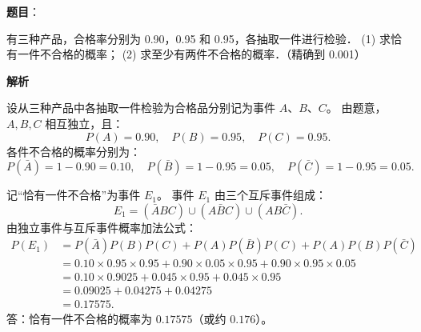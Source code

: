 \begin{answer}

\textbf{题目}：

有三种产品，合格率分别为 0.90，0.95 和 0.95，各抽取一件进行检验．
(1) 求恰有一件不合格的概率；
(2) 求至少有两件不合格的概率．（精确到 0.001）

\textbf{解析}

设从三种产品中各抽取一件检验为合格品分别记为事件 $A$、$B$、$C$。
由题意，$A, B, C$ 相互独立，且：
\nopagebreak[4]
\[P(A) = 0.90, \quad P(B) = 0.95, \quad P(C) = 0.95.\]
各件不合格的概率分别为：
\nopagebreak[4]
\[P(\bar{A}) = 1 - 0.90 = 0.10, \quad P(\bar{B}) = 1 - 0.95 = 0.05, \quad P(\bar{C}) = 1 - 0.95 = 0.05.\]


记“恰有一件不合格”为事件 $E_1$。
事件 $E_1$ 由三个互斥事件组成：
\nopagebreak[4]
\[E_1 = (\bar{A} B C) \cup (A \bar{B} C) \cup (A B \bar{C}).\]
由独立事件与互斥事件概率加法公式：
\nopagebreak[4]
\[\begin{aligned}
P(E_1) &= P(\bar{A})P(B)P(C) + P(A)P(\bar{B})P(C) + P(A)P(B)P(\bar{C}) \\
&= 0.10 \times 0.95 \times 0.95 + 0.90 \times 0.05 \times 0.95 + 0.90 \times 0.95 \times 0.05 \\
&= 0.10 \times 0.9025 + 0.045 \times 0.95 + 0.045 \times 0.95 \\
&= 0.09025 + 0.04275 + 0.04275 \\
&= 0.17575.
\end{aligned}\]
答：恰有一件不合格的概率为 $0.17575$（或约 $0.176$）。



\end{answer}
